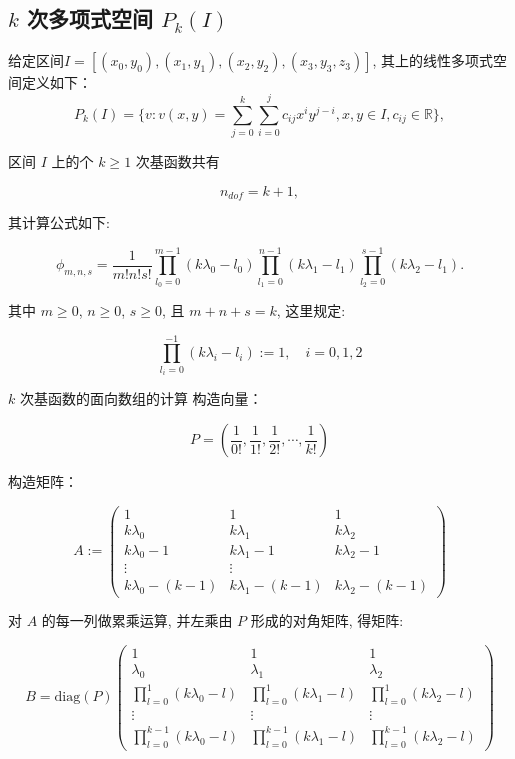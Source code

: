 \documentclass[12pt,a4paper]{article}
\begin{document}
\subsection{$k$ 次多项式空间 $P_k(I)$}

给定区间$I = [(x_0,y_0), (x_1,y_1), (x_2,y_2), (x_3,y_3,z_3)]$, 其上的线性多项式空间定义如下：
\begin{equation}
P_k(I) = \{v: v(x,y) =  \sum_{j=0}^k\sum_{i=0}^j c_{ij}x^iy^{j-i}, x,y\in I, c_{ij} \in \mathbb R\},
\end{equation}

区间 $I$ 上的个 $ k\geq 1 $ 次基函数共有 

$$n_{dof} = k+1,$$

其计算公式如下:

$$
\phi_{m,n,s} = \frac{1}{m!n!s!}\prod_{l_0 = 0}^{m - 1}
(k\lambda_0 - l_0) \prod_{l_1 = 0}^{n-1}(k\lambda_1 -
l_1)\prod_{l_2 = 0}^{s-1}(k\lambda_2 -
l_1).
$$

其中 $ m\geq 0$, $ n\geq 0 $, $ s\geq 0 $, 且 $ m+n+s=k $, 这里规定:

$$
\prod_{l_i=0}^{-1}(k\lambda_i - l_i) := 1,\quad i=0, 1,2
$$

$k$ 次基函数的面向数组的计算
构造向量： 

\[
P = ( \frac{1}{0!},  \frac{1}{1!}, \frac{1}{2!}, \cdots, \frac{1}{k!})
\]

构造矩阵： 

\[
A :=
\begin{pmatrix}
1  &  1  &  1 \\
k\lambda_0 & k\lambda_1& k\lambda_2\\
k\lambda_0 - 1 & k\lambda_1 - 1& k\lambda_2 - 1\\
\vdots & \vdots \\
k\lambda_0 - (k - 1) & k\lambda_1 - (k - 1)& k\lambda_2 - (k - 1)
\end{pmatrix}
\]

对 $A$ 的每一列做累乘运算, 并左乘由 $P$ 形成的对角矩阵, 得矩阵:

\[
B = \mathrm{diag}(P)
\begin{pmatrix}
1 & 1& 1\\
\lambda_0 & \lambda_1& \lambda_2\\
\prod_{l=0}^{1}(k\lambda_0 - l) & \prod_{l=0}^{1}(k\lambda_1 - l) & \prod_{l=0}^{1}(k\lambda_2 - l)\\
\vdots & \vdots  & \vdots\\
\prod_{l=0}^{k-1}(k\lambda_0 - l) & \prod_{l=0}^{k-1}(k\lambda_1 - l) & \prod_{l=0}^{k-1}(k\lambda_2 - l)
\end{pmatrix}
\]
\end{document}
